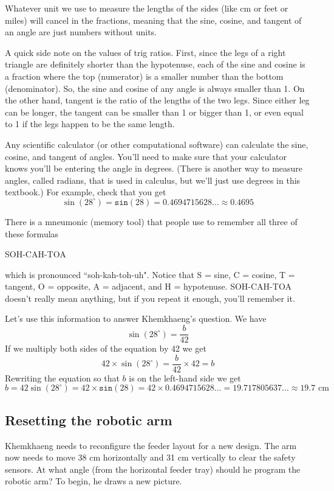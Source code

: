 Whatever unit we use to measure the lengths of the sides (like cm or feet or miles) will cancel in the fractions, meaning that the sine, cosine, and tangent of an angle are just numbers without units.

A quick side note on the values of trig ratios.  First, since the legs of a right triangle are definitely shorter than the hypotenuse, each of the sine and cosine is a fraction where the top (numerator) is a smaller number than the bottom (denominator). So, the sine and cosine of any angle is always smaller than 1.  On the other hand, tangent is the ratio of the lengths of the two legs. Since either leg can be longer, the tangent can be smaller than 1 or bigger than 1, or even equal to 1 if the legs happen to be the same length.

Any scientific calculator (or other computational software) can calculate the sine, cosine, and tangent of angles.  You'll need to make sure that your calculator knows you'll be entering the angle in degrees.  (There is another way to measure angles, called radians, that is used in calculus, but we'll just use degrees in this textbook.)
For example,  check that you get $$\sin(28^\circ) = \boxed{\texttt{sin}} (28) = 0.4694715628\ldots \approx 0.4695$$

There is a mneumonic (memory tool) that people use to remember all three of these formulas
\begin{center}
    SOH-CAH-TOA
\end{center}
which is pronounced ``soh-kah-toh-uh".  Notice that S = sine, C = cosine, T = tangent, O = opposite, A = adjacent, and H = hypotenuse.  SOH-CAH-TOA doesn't really mean anything, but if you repeat it enough, you'll remember it.  

Let's use this information to answer Khemkhaeng's question. We have $$\sin(28^\circ) = \frac{b}{42}$$
If we multiply both sides of the equation by 42 we get
$$42 \times \sin(28^\circ) = \frac{b}{42}\times 42 = b$$
Rewriting the equation so that $b$ is on the left-hand side we get
$$b = 42 \sin(28^\circ) = 42 \times \boxed{\texttt{sin}} (28) = 42 \times 0.4694715628\ldots = 19.717805637\ldots \approx 19.7 \text{ cm}$$

\subsection*{Resetting the robotic arm}

Khemkhaeng needs to reconfigure the feeder layout for a new design.  The arm now needs to move 38 cm horizontally and 31 cm vertically to clear the safety sensors. At what angle (from the horizontal feeder tray) should he program the robotic arm? To begin, he draws a new picture.

